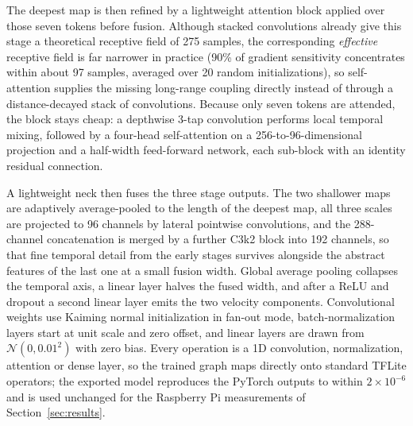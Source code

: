 \documentclass[10pt,conference,letterpaper]{IEEEtran}
\begin{document}
The deepest map is then refined by a lightweight attention block applied
over those seven tokens before fusion. Although stacked convolutions
already give this stage a theoretical receptive field of 275 samples,
the corresponding \emph{effective} receptive field is far narrower in
practice (90\% of gradient sensitivity concentrates within about 97
samples, averaged over 20 random initializations), so self-attention
supplies the missing long-range coupling directly instead of through a
distance-decayed stack of convolutions. Because only seven tokens are
attended, the block stays cheap: a depthwise 3-tap convolution performs
local temporal mixing, followed by a four-head self-attention on a
256-to-96-dimensional projection and a half-width feed-forward network,
each sub-block with an identity residual connection.

A lightweight neck then fuses the three stage outputs. The two
shallower maps are adaptively average-pooled to the length of the
deepest map, all three scales are projected to 96 channels by lateral
pointwise convolutions, and the 288-channel concatenation is merged by
a further C3k2 block into 192 channels, so that fine temporal detail
from the early stages survives alongside the abstract features of the
last one at a small fusion width. Global average pooling collapses the
temporal axis, a linear layer halves the fused width, and after a ReLU
and dropout a second linear layer emits the two velocity components.
Convolutional weights use Kaiming normal initialization in fan-out
mode, batch-normalization layers start at unit scale and zero offset,
and linear layers are drawn from $\mathcal{N}(0, 0.01^2)$ with zero
bias. Every operation is a 1D convolution, normalization, attention or
dense layer, so the trained graph maps directly onto standard TFLite
operators; the exported model reproduces the PyTorch outputs to within
$2\times10^{-6}$ and is used unchanged for the Raspberry Pi
measurements of Section~\ref{sec:results}.
\end{document}
